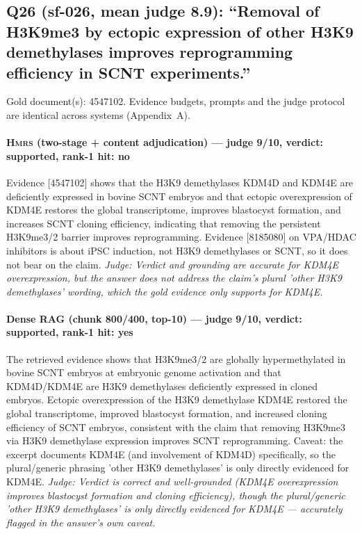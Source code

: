 \documentclass[sigconf, review, anonymous]{acmart}
\begin{document}
\subsection{Q26 (sf-026, mean judge 8.9): ``Removal of H3K9me3 by ectopic expression of other H3K9 demethylases improves reprogramming efficiency in SCNT experiments.''}
\label{app:q26}
\noindent Gold document(s): 4547102. Evidence budgets, prompts and the judge protocol are identical across systems (Appendix~A).
\paragraph{\textbf{\textsc{Hmrs}} (two-stage + content adjudication) --- judge 9/10, verdict: supported, rank-1 hit: no}
\noindent Evidence [4547102] shows that the H3K9 demethylases KDM4D and KDM4E are deficiently expressed in bovine SCNT embryos and that ectopic overexpression of KDM4E restores the global transcriptome, improves blastocyst formation, and increases SCNT cloning efficiency, indicating that removing the persistent H3K9me3/2 barrier improves reprogramming. Evidence [8185080] on VPA/HDAC inhibitors is about iPSC induction, not H3K9 demethylases or SCNT, so it does not bear on the claim.
\noindent\small\textit{Judge: Verdict and grounding are accurate for KDM4E overexpression, but the answer does not address the claim's plural 'other H3K9 demethylases' wording, which the gold evidence only supports for KDM4E.}
\paragraph{Dense RAG (chunk 800/400, top-10) --- judge 9/10, verdict: supported, rank-1 hit: yes}
\noindent The retrieved evidence shows that H3K9me3/2 are globally hypermethylated in bovine SCNT embryos at embryonic genome activation and that KDM4D/KDM4E are H3K9 demethylases deficiently expressed in cloned embryos. Ectopic overexpression of the H3K9 demethylase KDM4E restored the global transcriptome, improved blastocyst formation, and increased cloning efficiency of SCNT embryos, consistent with the claim that removing H3K9me3 via H3K9 demethylase expression improves SCNT reprogramming. Caveat: the excerpt documents KDM4E (and involvement of KDM4D) specifically, so the plural/generic phrasing 'other H3K9 demethylases' is only directly evidenced for KDM4E.
\noindent\small\textit{Judge: Verdict is correct and well-grounded (KDM4E overexpression improves blastocyst formation and cloning efficiency), though the plural/generic 'other H3K9 demethylases' is only directly evidenced for KDM4E --- accurately flagged in the answer's own caveat.}
\end{document}
